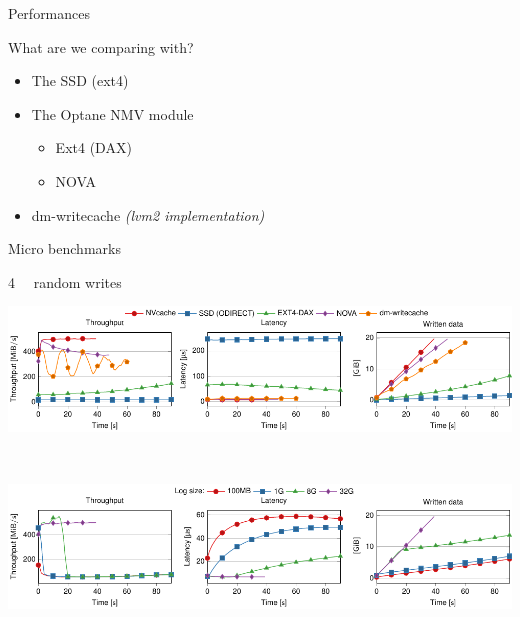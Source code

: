 \documentclass[presentation]{beamer}
\begin{document}
\begin{frame}[label={sec:org90782a5}]{Performances}
\begin{block}{What are we comparing with?\pause}
\begin{itemize}
\item The {\color{blue}SSD} (ext4)\pause\\
\item The Optane NMV module\\
\begin{itemize}
\item {\color{olive}Ext4 (DAX)}\\
\item {\color{violet}NOVA} \pause\\
\end{itemize}
\item {\color{orange}dm-writecache} \emph{(lvm2 implementation)}\\
\end{itemize}
\end{block}
\end{frame}


\begin{frame}[label={sec:org90077df}]{Micro benchmarks}
\begin{block}{\SI{4}{\kibi\byte} random writes}
\begin{center}
\includegraphics[width=.9\linewidth]{./IMGs/paper-figure1.pdf}
\end{center} \pause\\

\begin{center}
\includegraphics[width=.9\linewidth]{./IMGs/paper-figure2.pdf}
\end{center}
\end{block}
\end{frame}
\end{document}
